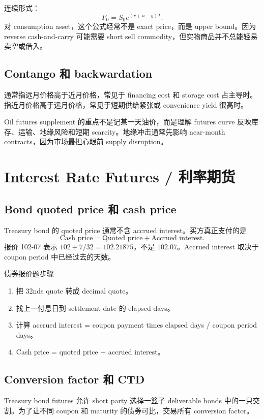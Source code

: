 连续形式：
\[
F_0=S_0e^{(r+u-y)T}.
\]
对 consumption asset，这个公式经常不是 exact price，而是 upper bound。因为 reverse cash-and-carry 可能需要 short sell commodity，但实物商品并不总能轻易卖空或借入。

\subsection{Contango 和 backwardation}
 通常指远月价格高于近月价格，常见于 financing cost 和 storage cost 占主导时。 指近月价格高于远月价格，常见于短期供给紧张或 convenience yield 很高时。

Oil futures supplement 的重点不是记某一天油价，而是理解 futures curve 反映库存、运输、地缘风险和短期 scarcity。地缘冲击通常先影响 near-month contracts，因为市场最担心眼前 supply disruption。

\section{Interest Rate Futures / 利率期货}

\subsection{Bond quoted price 和 cash price}
Treasury bond 的 quoted price 通常不含 accrued interest。买方真正支付的是
\[
\text{Cash price}=\text{Quoted price}+\text{Accrued interest}.
\]
报价 102-07 表示 $102+7/32=102.21875$，不是 $102.07$。Accrued interest 取决于 coupon period 中已经过去的天数。

\begin{workflowbox}{债券报价题步骤}
\begin{enumerate}
  \item 把 32nds quote 转成 decimal quote。
  \item 找上一付息日到 settlement date 的 elapsed days。
  \item 计算 accrued interest = coupon payment times elapsed days / coupon period days。
  \item Cash price = quoted price + accrued interest。
\end{enumerate}
\end{workflowbox}

\subsection{Conversion factor 和 CTD}
Treasury bond futures 允许 short party 选择一篮子 deliverable bonds 中的一只交割。为了让不同 coupon 和 maturity 的债券可比，交易所有 conversion factor。

